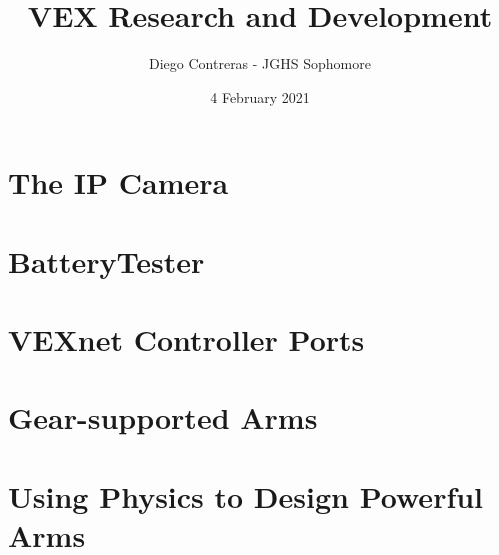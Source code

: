 \documentclass[12pt]{article}
\title{VEX Research and Development}
\author{Diego Contreras - JGHS Sophomore}
\date{4 February 2021}
\begin{document}
\maketitle
\newpage
\tableofcontents



\newpage
\section{The IP Camera}






\section{BatteryTester}
\section{VEXnet Controller Ports}
\section{Gear-supported Arms}
\section{Using Physics to Design Powerful Arms}



\end{document}
